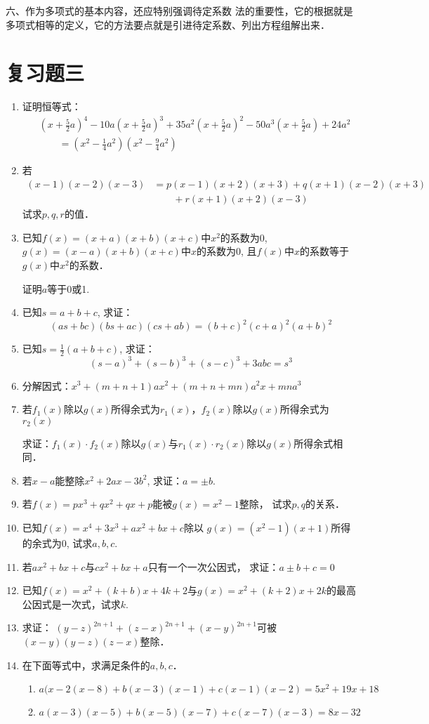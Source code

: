 六、作为多项式的基本内容，还应特别强调待定系数
法的重要性，它的根据就是多项式相等的定义，它的方法要点就是引进待定系数、列出方程组解出来．



\section*{复习题三}
\begin{enumerate}
\item 证明恒等式：
\[\begin{split}
   & \left(x+\frac{5}{2}a\right)^4-10a\left(x+\frac{5}{2}a\right)^3+35a^2\left(x+\frac{5}{2}a\right)^2-50a^3\left(x+\frac{5}{2}a\right)+24a^2\\
&\qquad = \left(x^2-\frac{1}{4}a^2\right)\left(x^2-\frac{9}{4}a^2\right)
\end{split}\]
\item 若
\[\begin{split}
    (x-1)(x-2)(x-3)&=p(x-1) (x+2)(x+3)+q(x+1)(x-2)(x+3)\\
    &\qquad  +r (x+1) (x+2)(x-3)
\end{split}\]
试求$p,q,r$的值．
\item 已知$f(x)=(x+a)(x+b)(x+c)$中$x^2$的系数为0, 
$g(x)=(x-a)(x+b)(x+c)$中$x$的系数为0, 且$f(x)$中$x$的系数等于$g(x)$中$x^2$的系数．

证明$a$等于0或1.
\item 已知$s=a+b+c$, 求证：
\[(as+bc) (bs+ac)(cs+ab)=(b+c)^2(c+a)^2(a+b)^2\]

\item 已知$s=\frac{1}{2}(a+b+c)$, 求证：
\[(s-a)^3+ (s-b)^3+ (s-c)^3+3abc=s^3\]
\item 分解因式：$x^3+ (m+n+1) ax^2+ (m+n+mn) a^2x+mna^3$
\item 若$f_1(x)$除以$g(x)$所得余式为$r_1(x)$，$f_2(x)$除以$g(x)$所得余式为$r_2(x)$

求证：$f_1(x)\cdot f_2(x)$除以$g(x)$与$r_1(x)\cdot r_2(x)$除以$g(x)$所得余式相同．

\item  若$x-a$能整除$x^2+2ax-3b^2$, 求证：$a=\pm b$.

\item  若$f(x)=px^3+qx^2+qx+p$能被$g(x)=x^2-1$整除，
试求$p,q$的关系．
\item  已知$f(x)=x^4+3x^3+ax^2+bx+c$除以
$g(x)=(x^2-1)(x+1)$所得的余式为0, 试求$a,b,c$.
\item  若$ax^2+bx+c$与$cx^2+bx+a$只有一个一次公因式，
求证：$a\pm b+c=0$
\item 已知$f(x)=x^2+(k+b)x+4k+2$与$g(x)=x^2+(k+2)x+2k$的最高公因式是一次式，试求$k$.
\item  求证：
$(y-z)^{2n+1}+(z-x)^{2n+1}+(x-y)^{2n+1}$可被$(x-y)(y-z)(z-x)$整除．
\item  在下面等式中，求满足条件的$a,b,c$．
\begin{enumerate}
    \item $a (x-2 (x-8) +b (x-3) (x-1)+c (x-1) (x-2)=5x^2+19x+18$
    \item $a (x-3) (x-5)+b(x-5)(x-7)+c (x-7) (x-3)=8x-32$
\end{enumerate}


\end{enumerate}
